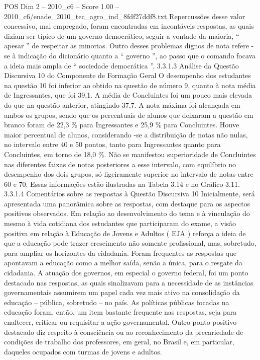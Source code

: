 \begin{textsample}{POS Dim 2 – 2010\_c6 – Score 1.00 – 2010\_c6/enade\_2010\_tec\_agro\_ind\_8fdf27ddf8.txt}
Repercussões desse valor concessivo, mal empregado, foram encontradas em incontáveis respostas, as quais diziam ser típico de um governo democrático, seguir a vontade da maioria, “ apesar ” de respeitar as minorias.
Outro desses problemas dignos de nota refere -se à indicação do dicionário quanto a “ governo ”, ao passo que o comando focava a ideia mais ampla de “ sociedade democrática ”. 3.3.1.3 Análise da Questão Discursiva 10 do Componente de Formação Geral O desempenho dos estudantes na questão 10 foi inferior ao obtido na questão de número 9, quanto à nota média de Ingressantes, que foi 39,1.
A média de Concluintes foi um pouco mais elevada do que na questão anterior, atingindo 37,7.
A nota máxima foi alcançada em ambos os grupos, sendo que os percentuais de alunos que deixaram a questão em branco foram de 22,3 \% para Ingressantes e 25,9 \% para Concluintes.
Houve maior percentual de alunos, considerando -se a distribuição de notas não nulas, no intervalo entre 40 e 50 pontos, tanto para Ingressantes quanto para Concluintes, em torno de 18,0 \%.
Não se manifestou superioridade de Concluintes nas diferentes faixas de notas posteriores a esse intervalo, com equilíbrio no desempenho dos dois grupos, só ligeiramente superior no intervalo de notas entre 60 e 70.
Essas informações estão ilustradas na Tabela 3.14 e no Gráfico 3.11. 3.3.1.4 Comentários sobre as respostas à Questão Discursiva 10 Inicialmente, será apresentada uma panorâmica sobre as respostas, com destaque para os aspectos positivos observados.
Em relação ao desenvolvimento do tema e à vinculação do mesmo à vida cotidiana dos estudantes que participaram do exame, a visão positiva em relação à Educação de Jovens e Adultos ( EJA ) reforça a ideia de que a educação pode trazer crescimento não somente profissional, mas, sobretudo, para ampliar os horizontes da cidadania.
Foram frequentes as respostas que apontavam a educação como a melhor saída, senão a única, para o resgate da cidadania.
A atuação dos governos, em especial o governo federal, foi um ponto destacado nas respostas, as quais sinalizavam para a necessidade de as instâncias governamentais assumirem um papel cada vez mais ativo na consolidação da educação – pública, sobretudo – no país.
As políticas públicas focadas na educação foram, então, um item bastante frequente nas respostas, seja para enaltecer, criticar ou requisitar a ação governamental.
Outro ponto positivo destacado diz respeito à consciência ou ao reconhecimento da precariedade de condições de trabalho dos professores, em geral, no Brasil e, em particular, daqueles ocupados com turmas de jovens e adultos.

\end{textsample}
